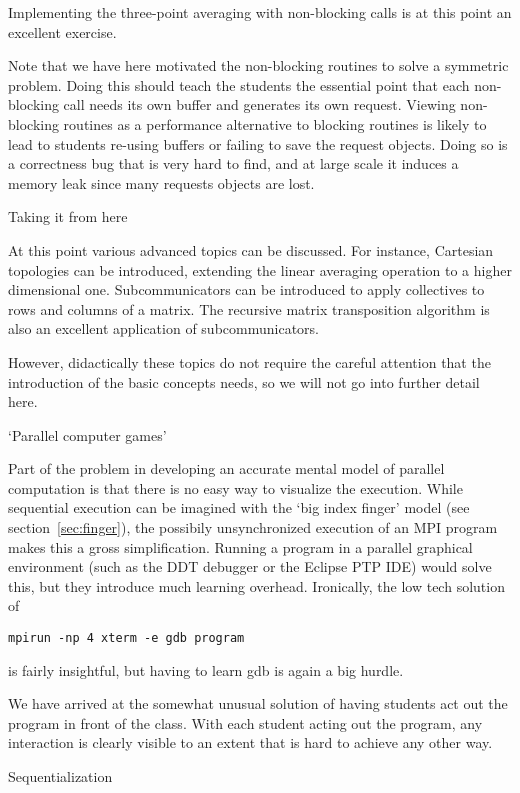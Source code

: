 Implementing the three-point averaging with non-blocking calls
is at this point an excellent exercise.

Note that we have here motivated the non-blocking
routines to solve a symmetric problem. Doing this should 
teach the students the essential point that each non-blocking
call needs its own buffer and generates its own request.
Viewing non-blocking routines as a performance alternative to blocking
routines is likely to lead to students re-using buffers or failing to
save the request objects.
Doing so is a correctness bug that is very hard to find, and
at large scale it induces a memory leak since many requests objects
are lost.

 {Taking it from here}

At this point various advanced topics can be discussed. For instance,
Cartesian topologies can be introduced, extending the linear averaging operation
to a higher dimensional one.
Subcommunicators can be introduced to apply collectives to rows and
columns of a matrix. The recursive matrix transposition algorithm is also
an excellent application of subcommunicators.

However, didactically these topics do not require the careful
attention that the introduction of the basic concepts needs, so we
will not go into further detail here.

 {`Parallel computer games'}
\label{sec:games}

Part of the problem in developing an accurate mental model of parallel
computation is that there is no easy way to visualize the execution.
While sequential execution can be imagined with the `big index finger'
model (see section~\ref{sec:finger}), the possibily unsynchronized
execution of an MPI program makes this a gross simplification.
Running a program in a parallel graphical environment (such as the DDT
debugger or the Eclipse PTP IDE) would solve this, but they introduce
much learning overhead. Ironically, the low tech solution of
\begin{verbatim}
mpirun -np 4 xterm -e gdb program
\end{verbatim}
is fairly insightful, but having to learn gdb is again a big hurdle.

We have arrived at the somewhat unusual solution of having students
act out the program in front of the class. With each student acting
out the program, any interaction is clearly visible to an extent that
is hard to achieve any other way.

 {Sequentialization}
\label{sec:seq-game}

